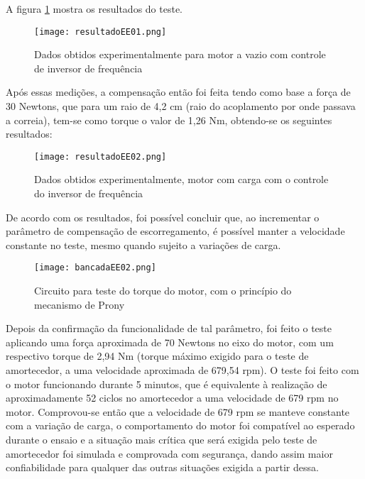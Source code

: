 			A figura \ref{resultadoEE01} mostra os resultados do teste.

 			\begin{figure}[!h]
				\centering
				\texttt{[image: resultadoEE01.png]}
				\caption[Dados obtidos experimentalmente para motor a vazio com controle de inversor de frequência]{Dados obtidos experimentalmente para motor a vazio com controle de inversor de frequência} 
				\label{resultadoEE01}
			\end{figure}

			Após essas medições, a compensação então foi feita tendo como base a força de 30 Newtons, que para um raio de 4,2 cm (raio do acoplamento por onde passava a correia), tem-se como torque o valor de 1,26 Nm, obtendo-se os seguintes resultados:

			\begin{figure}[!h]
				\centering
				\texttt{[image: resultadoEE02.png]}
				\caption[Dados obtidos experimentalmente, motor com carga com o controle do inversor de frequência]{Dados obtidos experimentalmente, motor com carga com o controle do inversor de frequência} 
				\label{resultadoEE02}
			\end{figure}

			De acordo com os resultados, foi possível concluir que, ao incrementar o parâmetro de compensação de escorregamento, é possível manter a velocidade constante no teste, mesmo quando sujeito a variações de carga.

			\begin{figure}[!h]
				\centering
				\texttt{[image: bancadaEE02.png]}
				\caption[Circuito para teste do torque do motor, com o princípio do mecanismo de Prony]{Circuito para teste do torque do motor, com o princípio do mecanismo de Prony} 
				\label{bancadaEE02}
			\end{figure}

			Depois da confirmação da funcionalidade de tal parâmetro, foi feito o teste aplicando uma força aproximada de 70 Newtons no eixo do motor, com um respectivo torque de 2,94 Nm (torque máximo exigido para o teste de amortecedor, a uma velocidade aproximada de 679,54 rpm). O teste foi feito com o motor funcionando durante 5 minutos, que é equivalente à realização de aproximadamente 52 ciclos no amortecedor a uma velocidade de 679 rpm no motor. Comprovou-se então que a velocidade de 679 rpm se manteve constante com a variação de carga, o comportamento do motor foi compatível ao esperado durante o ensaio e a situação mais crítica que será exigida pelo teste de amortecedor foi simulada e comprovada com segurança, dando assim maior confiabilidade para qualquer das outras situações exigida a partir dessa.

